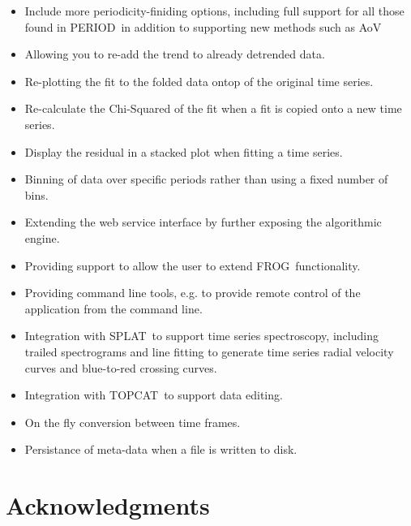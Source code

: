\documentclass[twoside,11pt,nolof]{starlink}
\providecommand{\FROG}{\textsf{FROG}}
\providecommand{\SPLAT}{\textsf{SPLAT}}
\providecommand{\TOPCAT}{\textsf{TOPCAT}}
\providecommand{\PERIOD}{\textsf{PERIOD}}
\begin{document}
\begin{itemize}

\item Include more periodicity-finiding options, including full support for all those found in \PERIOD\, in addition to supporting new methods such as AoV

\item Allowing you to re-add the trend to already detrended data.

\item Re-plotting the fit to the folded data ontop of the original time series. 

\item Re-calculate the Chi-Squared of the fit when a fit is copied onto a new time series.

\item Display the residual in a stacked plot when fitting a time series.
 
\item Binning of data over specific periods rather than using a fixed number of bins.

\item Extending the web service interface by further exposing the algorithmic engine.

\item Providing  support to allow the user to extend \FROG\ functionality.

\item Providing command line tools, e.g. to provide remote control of the application from the command line.

\item Integration with \SPLAT\ to support time series spectroscopy, including trailed spectrograms and line fitting to generate time series radial velocity curves and blue-to-red crossing curves.

\item Integration with \TOPCAT\ to support data editing.

\item On the fly conversion between time frames.

\item Persistance of meta-data when a file is written to disk.

\end{itemize}

\section{Acknowledgments}
\end{document}
